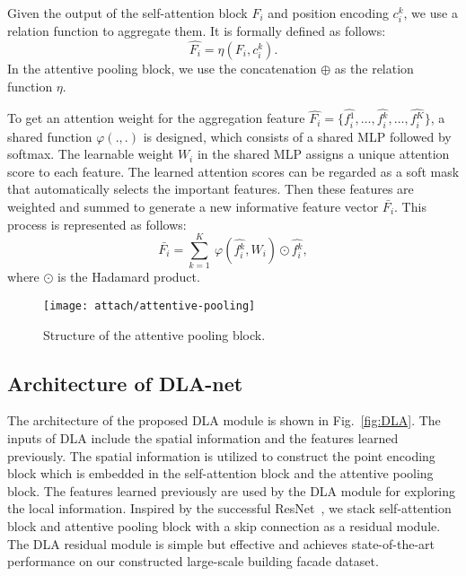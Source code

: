 \documentclass[review]{elsarticle}
\begin{document}
Given the output of the self-attention block $F_i$ and position encoding $c{}^k_i$, we use a relation function to aggregate them.
It is formally defined as follows:
\begin{equation}
	\label{eq:a}
	\hat{F_i} = \eta(F_i, c{}^k_i).
\end{equation}
In the attentive pooling block, we use the concatenation $\oplus$ as the relation function $\eta$.

To get an attention weight for the aggregation feature $\hat{F_i} = \{\hat{f{}^1_i},\ldots,\hat{f{}^k_i},\ldots,\hat{f{}^K_i}\}$, a shared function $\varphi(.,.)$ is designed, which consists of a shared MLP followed by softmax. The learnable weight $W_i$ in the shared MLP assigns a unique attention score to each feature. The learned attention scores can be regarded as a soft mask that automatically selects the important features. Then these features are weighted and summed to generate a new informative feature vector $\bar{F_i}$. This process is represented as follows:
\begin{equation}
	\label{eq:b}
	\bar{F_i} = \sum \limits_{k=1}^{K}  \ \varphi(\hat{f{}^k_i},W_i) \odot \hat{f{}^k_i},
\end{equation}
where $\odot$ is the Hadamard product.

\begin{figure}[!t]
	\centering
	\texttt{[image: attach/attentive-pooling]}
	\caption{Structure of the attentive pooling block.}
	\label{fig:attentive-pooling}
\end{figure}	

\subsection{\textbf{Architecture of DLA-net}}
The architecture of the proposed DLA module is shown in Fig.~\ref{fig:DLA}. The inputs of DLA include the spatial information and the features learned previously. The spatial information is utilized to construct the point encoding block which is embedded in the self-attention block and the attentive pooling block. The features learned previously are used by the DLA module for exploring the local information. Inspired by the successful ResNet~\cite{he2016deep}, we stack self-attention block and attentive pooling block with a skip connection as a residual module. The DLA residual module is simple but effective and achieves state-of-the-art performance on our constructed large-scale building facade dataset.
\end{document}
